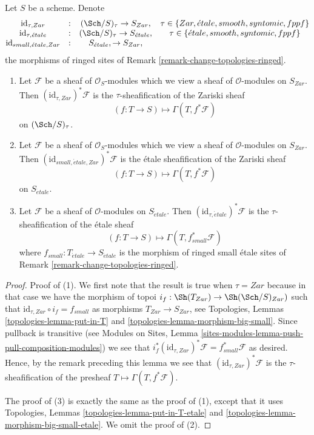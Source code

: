 \begin{lemma}
\label{lemma-compare-sites}
Let $S$ be a scheme. Denote
$$
\begin{matrix}
\text{id}_{\tau, Zar} & : & (\Sch/S)_\tau \to S_{Zar}, &
\tau \in \{Zar, \acute{e}tale, smooth, syntomic, fppf\} \\
\text{id}_{\tau, \acute{e}tale} & : &
(\Sch/S)_\tau \to S_{\acute{e}tale}, &
\tau \in \{\acute{e}tale, smooth, syntomic, fppf\} \\
\text{id}_{small, \acute{e}tale, Zar} & : & S_{\acute{e}tale}, \to S_{Zar},
\end{matrix}
$$
the morphisms of ringed sites of
Remark \ref{remark-change-topologies-ringed}.
\begin{enumerate}
\item Let $\mathcal{F}$ be a sheaf of $\mathcal{O}_S$-modules
which we view a sheaf of $\mathcal{O}$-modules on $S_{Zar}$. Then
$(\text{id}_{\tau, Zar})^*\mathcal{F}$ is the $\tau$-sheafification
of the Zariski sheaf
$$
(f : T \to S) \longmapsto \Gamma(T, f^*\mathcal{F})
$$
on $(\Sch/S)_\tau$.
\item Let $\mathcal{F}$ be a sheaf of $\mathcal{O}_S$-modules
which we view a sheaf of $\mathcal{O}$-modules on $S_{Zar}$. Then
$(\text{id}_{small, \acute{e}tale, Zar})^*\mathcal{F}$ is the
\'etale sheafification of the Zariski sheaf
$$
(f : T \to S) \longmapsto \Gamma(T, f^*\mathcal{F})
$$
on $S_{\acute{e}tale}$.
\item Let $\mathcal{F}$ be a sheaf of $\mathcal{O}$-modules
on $S_{\acute{e}tale}$. Then
$(\text{id}_{\tau, \acute{e}tale})^*\mathcal{F}$ is the $\tau$-sheafification
of the \'etale sheaf
$$
(f : T \to S) \longmapsto \Gamma(T, f_{small}^*\mathcal{F})
$$
where $f_{small} : T_{\acute{e}tale} \to S_{\acute{e}tale}$
is the morphism of ringed small \'etale sites of
Remark \ref{remark-change-topologies-ringed}.
\end{enumerate}
\end{lemma}

\begin{proof}
Proof of (1). We first note that the result is true when $\tau = Zar$
because in that case we have the morphism of topoi
$i_f : \Sh(T_{Zar}) \to \Sh(\Sch/S)_{Zar})$
such that $\text{id}_{\tau, Zar} \circ i_f = f_{small}$ as morphisms
$T_{Zar} \to S_{Zar}$, see
Topologies, Lemmas \ref{topologies-lemma-put-in-T} and
\ref{topologies-lemma-morphism-big-small}.
Since pullback is transitive (see
Modules on Sites,
Lemma \ref{sites-modules-lemma-push-pull-composition-modules})
we see that
$i_f^*(\text{id}_{\tau, Zar})^*\mathcal{F} = f_{small}^*\mathcal{F}$
as desired. Hence, by the remark preceding this lemma we see that
$(\text{id}_{\tau, Zar})^*\mathcal{F}$ is the $\tau$-sheafification of
the presheaf $T \mapsto \Gamma(T, f^*\mathcal{F})$.

\medskip\noindent
The proof of (3) is exactly the same as the proof of (1), except that it
uses
Topologies, Lemmas \ref{topologies-lemma-put-in-T-etale} and
\ref{topologies-lemma-morphism-big-small-etale}.
We omit the proof of (2).
\end{proof}

